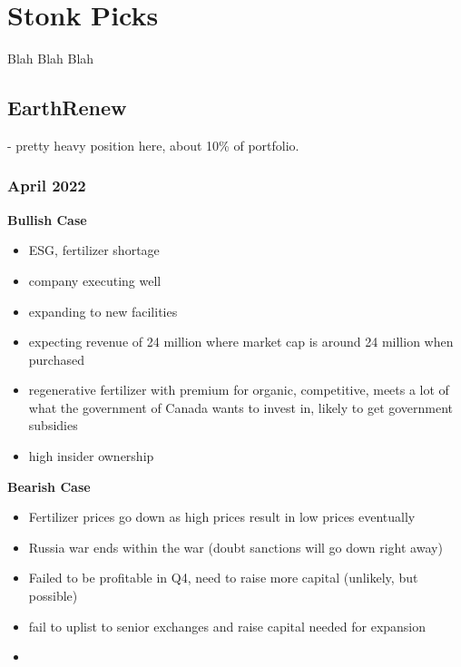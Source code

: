 \chapter{Stonk Picks}

Blah Blah Blah


\section{EarthRenew}

- pretty heavy position here, about 10\% of portfolio.

\subsection{April 2022}

\textbf{Bullish Case}

\begin{itemize}
    \item ESG, fertilizer shortage
    \item company executing well
    \item expanding to new facilities
    \item expecting revenue of 24 million where market cap is around 24 million when purchased
    \item regenerative fertilizer with premium for organic, competitive, meets a lot of what the government of Canada wants to invest in, likely to get government subsidies
    \item high insider ownership
\end{itemize}

\textbf{Bearish Case}

\begin{itemize}
    \item Fertilizer prices go down as high prices result in low prices eventually
    \item Russia war ends within the war (doubt sanctions will go down right away)
    \item Failed to be profitable in Q4, need to raise more capital (unlikely, but possible)
    \item fail to uplist to senior exchanges and raise capital needed for expansion
    \item 
\end{itemize}